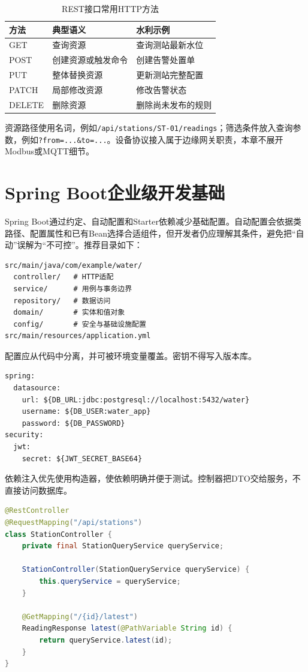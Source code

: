 \begin{table}[htbp]
\centering
\caption{REST接口常用HTTP方法}
\label{tab:http-methods}
\begin{tabular}{lll}
\toprule
方法 & 典型语义 & 水利示例 \\
\midrule
GET & 查询资源 & 查询测站最新水位 \\
POST & 创建资源或触发命令 & 创建告警处置单 \\
PUT & 整体替换资源 & 更新测站完整配置 \\
PATCH & 局部修改资源 & 修改告警状态 \\
DELETE & 删除资源 & 删除尚未发布的规则 \\
\bottomrule
\end{tabular}
\end{table}

资源路径使用名词，例如\texttt{/api/stations/ST-01/readings}；筛选条件放入查询参数，例如\texttt{?from=...\&to=...}。设备协议接入属于边缘网关职责，本章不展开Modbus或MQTT细节。

\section{Spring Boot企业级开发基础}

Spring Boot通过约定、自动配置和Starter依赖减少基础配置。自动配置会依据类路径、配置属性和已有Bean选择合适组件，但开发者仍应理解其条件，避免把“自动”误解为“不可控”。推荐目录如下：

\begin{lstlisting}
src/main/java/com/example/water/
  controller/   # HTTP适配
  service/      # 用例与事务边界
  repository/   # 数据访问
  domain/       # 实体和值对象
  config/       # 安全与基础设施配置
src/main/resources/application.yml
\end{lstlisting}

配置应从代码中分离，并可被环境变量覆盖。密钥不得写入版本库。

\begin{lstlisting}
spring:
  datasource:
    url: ${DB_URL:jdbc:postgresql://localhost:5432/water}
    username: ${DB_USER:water_app}
    password: ${DB_PASSWORD}
security:
  jwt:
    secret: ${JWT_SECRET_BASE64}
\end{lstlisting}

依赖注入优先使用构造器，使依赖明确并便于测试。控制器把DTO交给服务，不直接访问数据库。

\begin{lstlisting}[language=Java]
@RestController
@RequestMapping("/api/stations")
class StationController {
    private final StationQueryService queryService;

    StationController(StationQueryService queryService) {
        this.queryService = queryService;
    }

    @GetMapping("/{id}/latest")
    ReadingResponse latest(@PathVariable String id) {
        return queryService.latest(id);
    }
}
\end{lstlisting}

